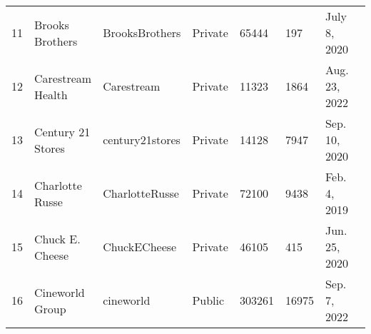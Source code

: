 \documentclass[9pt,twoside,lineno]{pnas-new}
\begin{document}
\begin{longtable}{llllllll}
11          & Brooks Brothers                                                                 & BrooksBrothers                                                      & Private          & 65444              & 197                & July 8, 2020                                                                                                                          \\
12          & Carestream Health                                                               & Carestream                                                          & Private          & 11323              & 1864               & Aug. 23, 2022                                                                                                                       \\
13          & Century 21 Stores                                                               & century21stores                                                     & Private          & 14128              & 7947               & Sep. 10, 2020                                                                                                                    \\
14          & Charlotte Russe                                                                 & CharlotteRusse                                                      & Private          & 72100              & 9438               & Feb. 4, 2019                                                                                                                      \\
15          & Chuck E. Cheese                                                                 & ChuckECheese                                                        & Private          & 46105              & 415                & Jun. 25, 2020                                                                                                                         \\
16          & Cineworld Group                                                                 & cineworld                                                           & Public           & 303261             & 16975              & Sep. 7, 2022                                                                                                                     \\

\end{longtable}
\end{document}
